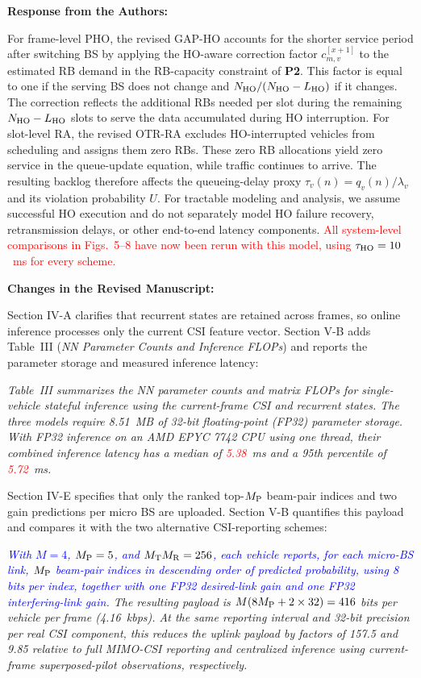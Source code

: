\documentclass[11pt]{article}
\newenvironment{reviewedit}[1]
{\colorlet{responseblue}{#1}\colorlet{changeblue}{#1}\color{#1}}
{}
\newenvironment{authorresponse}
{\par\noindent\textcolor{responseblue}{\textbf{Response from the Authors:}}\par\color{responseblue}}
{\par}
\newenvironment{manuscriptchanges}
{\par\noindent\textcolor{changeblue}{\textbf{Changes in the Revised Manuscript:}}\par\color{changeblue}}
{\par}
\begin{document}
\begin{reviewedit}{blue}
\begin{authorresponse}
For frame-level PHO, the revised GAP-HO accounts for the shorter service period after
switching BS by applying the HO-aware correction factor $c_{m,v}^{[x+1]}$ to the estimated RB demand in the
RB-capacity constraint of \textbf{P2}. This factor is equal to one if the serving BS
does not change and $N_{\rm HO}/(N_{\rm HO}-L_{\rm HO})$ if it changes.
The correction reflects the additional RBs needed per slot during the
remaining $N_{\rm HO}-L_{\rm HO}$ slots to serve the data accumulated during HO
interruption. For slot-level RA, the revised OTR-RA excludes HO-interrupted vehicles from
scheduling and assigns them zero RBs. 
These zero RB allocations yield zero service in the queue-update equation,
while traffic continues to arrive. The resulting backlog therefore affects
the queueing-delay proxy $\tau_v(n)=q_v(n)/\lambda_v$ and its violation
probability $U$. 
For tractable modeling and analysis, we assume successful HO execution and
do not separately model HO failure recovery, retransmission delays, or other
end-to-end latency components.
\textcolor{red}{All system-level comparisons in Figs.~5--8 have now been
rerun with this model, using $\tau_{\rm HO}=10$~ms for every scheme.}
\end{authorresponse}
\begin{manuscriptchanges}
Section IV-A clarifies that recurrent states are retained across frames,
so online inference processes only the current CSI feature vector.
Section V-B adds Table~III (\emph{NN Parameter Counts and Inference FLOPs})
and reports the parameter storage and measured inference latency:

\emph{Table~III summarizes the NN parameter counts and matrix FLOPs for single-vehicle stateful inference using the current-frame CSI and recurrent states. The three models require 8.51~MB of 32-bit floating-point (FP32) parameter storage. With FP32 inference on an AMD EPYC 7742 CPU using one thread, their combined inference latency has a median of \textcolor{red}{5.38}~ms and a 95th percentile of \textcolor{red}{5.72}~ms.}

Section IV-E specifies that only the ranked top-$M_{\rm P}$ beam-pair indices
and two gain predictions per micro BS are uploaded. Section V-B quantifies
this payload and compares it with the two alternative CSI-reporting schemes:

\emph{\textcolor{blue}{With $M=4$, $M_{\rm P}=5$, and $M_{\rm T}M_{\rm R}=256$, each vehicle reports, for each micro-BS link, $M_{\rm P}$ beam-pair indices in descending order of predicted probability, using 8 bits per index, together with one FP32 desired-link gain and one FP32 interfering-link gain.} The resulting payload is $M(8M_{\rm P}+2\times32)=416$ bits per vehicle per frame (4.16~kbps). At the same reporting interval and 32-bit precision per real CSI component, this reduces the uplink payload by factors of 157.5 and 9.85 relative to full MIMO-CSI reporting and centralized inference using current-frame superposed-pilot observations, respectively.}


\end{manuscriptchanges}
\end{reviewedit}
\end{document}
